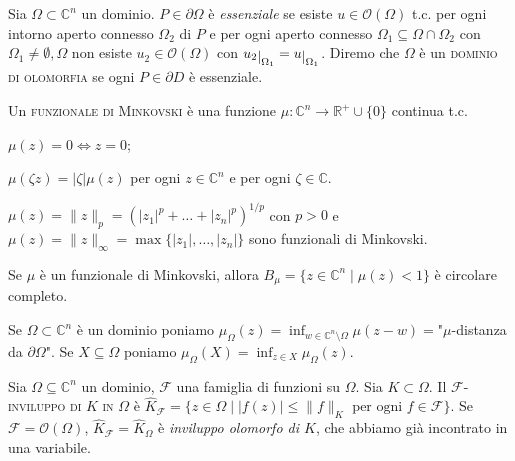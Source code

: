\begin{defn}
  Sia $\Omega \subset \mathbb{C}^n$ un dominio. $P \in \partial \Omega$ è \textit{essenziale} se esiste $u \in \mathcal{O}(\Omega)$ t.c. per ogni intorno aperto connesso $\Omega_2$ di $P$ e per ogni aperto connesso $\Omega_1 \subseteq \Omega \cap \Omega_2$ con $\Omega_1\not=\emptyset,\Omega$ non esiste $u_2 \in \mathcal{O}(\Omega)$ con $u_2\restrict{\Omega_1}=u\restrict{\Omega_1}$.
  Diremo che $\Omega$ è un \textsc{dominio di olomorfia} se ogni $P \in \partial D$ è essenziale.
\end{defn}

\begin{defn}
  Un \textsc{funzionale di Minkovski} è una funzione $\mu:\mathbb{C}^n \longrightarrow \mathbb{R}^+\cup\{0\}$ continua t.c.
  \begin{nlist}
    \item $\mu(z)=0 \iff z=0$;
    \item $\mu(\zeta z)=|\zeta|\mu(z)$ per ogni $z \in \mathbb{C}^n$ e per ogni $\zeta \in \mathbb{C}$.
  \end{nlist}
\end{defn}

\begin{ex}
  $\mu(z)=\|z\|_p=(|z_1|^p+\dots+|z_n|^p)^{1/p}$ con $p>0$ e $\mu(z)=\|z\|_{\infty}=\max\{|z_1|,\dots,|z_n|\}$ sono funzionali di Minkovski.
\end{ex}

\begin{exc}
  Se $\mu$ è un funzionale di Minkovski, allora $B_{\mu}=\{z \in \mathbb{C}^n \mid \mu(z)<1\}$ è circolare completo.
\end{exc}

Se $\Omega \subset \mathbb{C}^n$ è un dominio poniamo $\displaystyle \mu_\Omega(z)=\inf_{w \in \mathbb{C}^n\setminus\Omega} \mu(z-w)=$"$\mu$-distanza da $\partial\Omega$". Se $X \subseteq \Omega$ poniamo $\displaystyle \mu_\Omega(X)=\inf_{z \in X} \mu_\Omega(z)$.

\begin{defn}
  Sia $\Omega \subseteq \mathbb{C}^n$ un dominio, $\mathcal{F}$ una famiglia di funzioni su $\Omega$. Sia $K \subset \Omega$. Il \textsc{$\mathcal{F}$-inviluppo di $K$ in $\Omega$} è $\hat{K}_{\mathcal{F}}=\{z \in \Omega \mid |f(z)| \le \|f\|_K \text{ per ogni } f \in \mathcal{F}\}$.
  Se $\mathcal{F}=\mathcal{O}(\Omega)$, $\hat{K}_{\mathcal{F}}=\hat{K}_{\Omega}$ è \textit{inviluppo olomorfo di $K$}, che abbiamo già incontrato in una variabile.
\end{defn}

